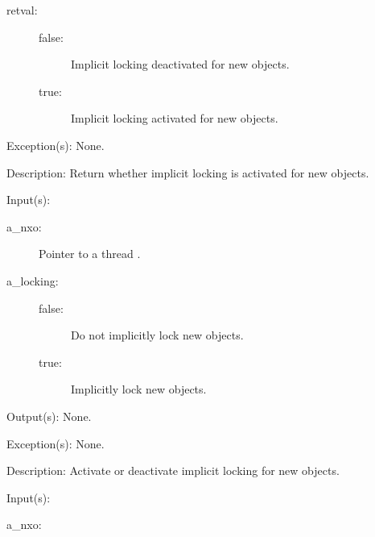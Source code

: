 \begin{capi}
\begin{capilist}
		\begin{description}\item[]
		\item[retval: ]
			\begin{description}\item[]
			\item[false: ]
				Implicit locking deactivated for new objects.
			\item[true: ]
				Implicit locking activated for new objects.
			\end{description}
		\end{description}
	\item[Exception(s): ] None.
	\item[Description: ]
		Return whether implicit locking is activated for new objects.
	\end{capilist}
\label{nxo_thread_setlocking}
	\begin{capilist}
	\item[Input(s): ]
		\begin{description}\item[]
		\item[a\_nxo: ]
			Pointer to a thread .
		\item[a\_locking: ]
			\begin{description}\item[]
			\item[false: ]
				Do not implicitly lock new objects.
			\item[true: ]
				Implicitly lock new objects.
			\end{description}
		\end{description}
	\item[Output(s): ] None.
	\item[Exception(s): ] None.
	\item[Description: ]
		Activate or deactivate implicit locking for new objects.
	\end{capilist}
\label{nxo_thread_maxestack_get}
	\begin{capilist}
	\item[Input(s): ]
		\begin{description}\item[]
		\item[a\_nxo: ]

\end{description}
\end{capilist}
\end{capi}
